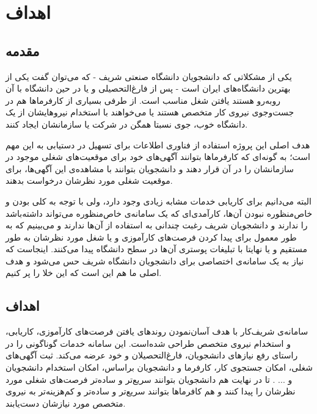 

\chapter{
اهداف
}



\section{مقدمه}

یکی از مشکلاتی که دانشجویان دانشگاه صنعتی شریف -  که می‌توان گفت یکی از بهترین دانشگاه‌های ایران است - پس از فارغ‌التحصیلی و یا در حین دانشگاه با آن روبه‌رو هستند یافتن شغل مناسب است.
از طرفی بسیاری از کارفرماها هم در جست‌وجوی نیروی کار متخصص هستند یا می‌خواهند با استخدام نیروهایشان از یک دانشگاه خوب،
جوی نسبتا همگن در شرکت یا سازمانشان ایجاد کنند.

هدف اصلی این پروژه استفاده از فناوری اطلاعات برای تسهیل در دستیابی به این مهم است؛ به گونه‌ای که کارفرماها بتوانند آگهی‌های خود برای موقعیت‌های شغلی موجود در سازمانشان را در آن قرار دهند و دانشجویان بتوانند با مشاهده‌ی این آگهی‌ها، برای موقعیت شغلی مورد نظرشان درخواست بدهند.

البته می‌دانیم برای کاریابی خدمات مشابه زیادی وجود دارد، ولی با توجه به کلی بودن و خاص‌منظوره نبودن آن‌ها، کارآمدی‌ای که یک سامانه‌ی خاص‌منظوره می‌تواند داشته‌باشد را ندارند و دانشجویان شریف رغبت چندانی به استفاده از آن‌ها ندارند و می‌بینیم که به طور معمول برای پیدا کردن فرصت‌های کارآموزی و یا شغل مورد نظرشان به طور مستقیم و یا نهایتا با تبلیغات پوستری آن‌ها در سطح دانشگاه پیدا می‌کنند. اینجاست که نیاز به یک سامانه‌ی اختصاصی برای دانشجویان دانشگاه شریف حس می‌شود و هدف اصلی ما هم این است که این خلا را پر کنیم.

\section{اهداف}

سامانه‌ی شریف‌کار با هدف آسان‌نمودن روند‌های یافتن فرصت‌های کارآموزی، کاریابی، و استخدام نیروی متخصص طراحی شده‌است.
این سامانه خدمات گوناگونی را در راستای رفع نیازهای دانشجویان، فارغ‌التحصیلان و خود عرضه می‌کند.
ثبت آگهی‌های شغلی، امکان جستجوی کار، کارفرما و دانشجویان براساس، امکان استخدام دانشجویان و ... .
تا در نهایت هم دانشجویان بتوانند سریع‌تر و ساده‌تر فرصت‌های شغلی مورد نظرشان را پیدا کنند و هم کافرماها بتوانند سریع‌تر و ساده‌تر و کم‌هزینه‌تر به نیروی متخصص مورد نیازشان دست‌یابند.

